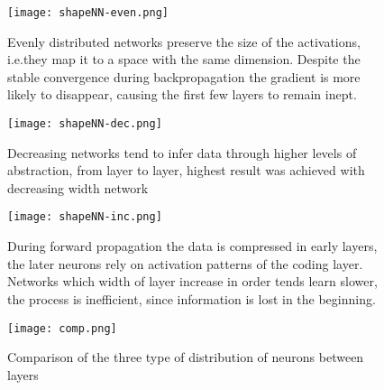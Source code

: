 \begin{figure}
    \centering
    \texttt{[image: shapeNN-even.png]}
    \caption{Evenly distributed networks preserve the size of the    
    activations,    
    i.e.they map it to a space with the same dimension. 
    Despite the stable convergence during backpropagation the gradient is more likely to disappear, causing the first few layers to remain inept.}
    \label{fig:even}
\end{figure}
\begin{figure}
    \centering
    \texttt{[image: shapeNN-dec.png]}
    \caption{Decreasing networks tend to infer data through 
    higher levels of abstraction, from layer to layer, highest result was 
    achieved with decreasing width network}
    \label{fig:dec}
\end{figure}
\begin{figure}
    \centering
    \texttt{[image: shapeNN-inc.png]}
    \caption{During forward propagation the data is compressed in early layers, the later neurons rely on activation patterns of the coding layer. Networks which width of layer increase in order tends learn slower, the process is inefficient, since information is lost in the beginning.}
    \label{fig:inc}
\end{figure}

\begin{figure}
    \centering
    \texttt{[image: comp.png]}
    \caption{Comparison of the three type of distribution of neurons between layers}
    \label{fig:comp}
\end{figure}


